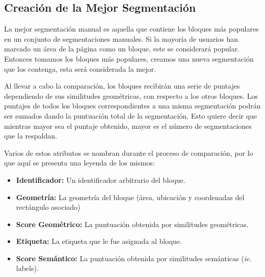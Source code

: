 \documentclass[10pt]{revecom}
\begin{document}
\subsection{Creación de la Mejor Segmentación}

La mejor segmentación manual es aquella que contiene los bloques más populares en un conjunto de segmentaciones manuales.
Si la mayoría de usuarios han marcado un área de la página como un bloque, este se considerará popular.
Entonces tomamos los bloques más populares, creamos una nueva segmentación que los contenga, esta será considerada la mejor.

Al llevar a cabo la comparación, los bloques recibirán una serie de puntajes dependiendo de sus similitudes geométricas, con respecto a los otros bloques. 
Los puntajes de todos los bloques correspondientes a una misma segmentación podrán ser sumados dando la puntuación total de la segmentación. 
Esto quiere decir que mientras mayor sea el puntaje obtenido, mayor es el número de segmentaciones que la respaldan. 

Varios de estos atributos se nombran durante el proceso de comparación, por lo que aquí se presenta una leyenda de los mismos:
\begin{itemize}
\item \textbf{Identificador:} Un identificador arbitrario del bloque. 
\item \textbf{Geometría:} La geometría del bloque (área, ubicación y coordenadas del rectángulo asociado)
\item \textbf{Score Geométrico:} La puntuación obtenida por similitudes geométricas. 
\item \textbf{Etiqueta:} La etiqueta que le fue asignada al bloque. 
\item \textbf{Score Semántico:} La puntuación obtenida por similitudes semánticas (\emph{ie.} labels). 
\end{itemize}
\end{document}
